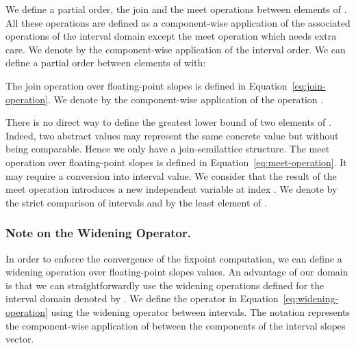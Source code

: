 We define a partial order, the join and the meet operations between
elements of . All these operations are defined as a component-wise
application of the associated operations of the interval domain except
the meet operation which needs extra care. We denote by
 the component-wise application of the interval
order. We can define a partial order  between elements
of  with: {\small
  
}

The join operation  over floating-point slopes is defined
in Equation~\eqref{eq:join-operation}. We denote by 
the component-wise application of the operation .  {\small
  
}

There is no direct way to define the greatest lower bound of two
elements of . Indeed, two abstract values may represent the same
concrete value but without being comparable. Hence we only have a
join-semilattice structure. The meet operation  over
floating-point slopes is defined in
Equation~\eqref{eq:meet-operation}. It may require a conversion into
interval value. We consider that the result of the meet operation
introduces a new independent variable at index . We denote by
 the strict comparison of intervals and by  the
least element of . {\small
  
}

\subsubsection*{Note on the Widening Operator.}
\label{sec:acceleration-of-convergence}

In order to enforce the convergence of the fixpoint computation, we
can define a widening operation  over floating-point slopes
values. An advantage of our domain is that we can straightforwardly
use the widening operations defined for the interval domain denoted by
. We define the operator  in
Equation~\eqref{eq:widening-operation} using the widening operator
between intervals. The notation  represents the
component-wise application of  between the components of
the interval slopes vector. {\small
  
}

